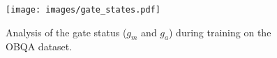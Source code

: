 \begin{figure}[!h]
    \centering
    \texttt{[image: images/gate\_states.pdf]}
    \caption{\label{fig:gate_states}
    Analysis of the gate status ($g_m$ and $g_a$) during training on the OBQA dataset.}
\end{figure}

